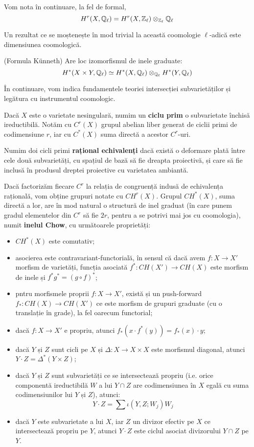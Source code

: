 \documentclass[13pt,openany]{book}
\begin{document}
Vom nota în continuare, la fel de formal,
$$H^r(X,\mathbb{Q}_\ell) = H^r(X,\mathbb{Z}_\ell) \otimes_{\mathbb{Z}_\ell} \mathbb{Q}_\ell$$

Un rezultat ce se moștenește în mod trivial la această coomologie $\ell$-adică este dimensiunea coomologică.

\begin{teo}
(Formula Künneth) Are loc izomorfismul de inele graduate:
$$H^*(X\times Y,\mathbb{Q}_\ell) \simeq H^*(X,\mathbb{Q}_\ell) \otimes_{\mathbb{Q}_\ell} H^*(Y,\mathbb{Q}_\ell)$$
\end{teo}

În continuare, vom indica fundamentele teoriei intersecției subvarietăților și legătura cu instrumentul coomologic.

Dacă $X$ este o varietate nesingulară, numim un {\bf ciclu prim} o subvarietate închisă ireductibilă. Notăm cu $C^r(X)$ grupul abelian liber generat de ciclii primi de codimensiune $r$, iar cu $C^*(X)$ suma directă a acestor $C^r$-uri.

Numim doi cicli primi {\bf rațional echivalenți} dacă există o deformare plată între cele două subvarietăți, cu spațiul de bază să fie dreapta proiectivă, și care să fie inclusă în produsul dreptei proiective cu varietatea ambiantă.

Dacă factorizăm fiecare $C^r$ la relația de congruență indusă de echivalența rațională, vom obține grupuri notate cu $CH^r(X)$. Grupul $CH^*(X)$, suma directă a lor, are în mod natural o structură de inel graduat (în care punem gradul elementelor din $C^r$ să fie $2r$, pentru a se potrivi mai jos cu coomologia), numit {\bf inelul Chow}, cu următoarele proprietăți:
\begin{itemize}
\item $CH^*(X)$ este comutativ;
\item asocierea este contravariant-functorială, în sensul că dacă avem $f: X \rightarrow X'$ morfism de varietăți, funcția asociată $f^*:CH(X') \rightarrow CH(X)$ este morfism de inele și $f^*g^* = (g \circ f)^*$;
\item pntru morfismele proprii $f: X \rightarrow X'$, există și un push-forward $f_*:CH(X) \rightarrow CH(X')$ ce este morfism de grupuri graduate (cu o translație în grade), la fel oarecum functorial;
\item dacă $f: X \rightarrow X'$ e propriu, atunci $f_*(x \cdot f^*(y)) = f_*(x) \cdot y$;
\item dacă $Y$ și $Z$ sunt cicli pe $X$ și $\Delta: X \rightarrow X \times X$ este morfismul diagonal, atunci $Y \cdot Z = \Delta^*(Y \times Z)$;
\item dacă $Y$ și $Z$ sunt subvarietăți ce se intersectează propriu (i.e. orice componentă ireductibilă $W$ a lui $Y \cap Z$ are codimensiunea în $X$ egală cu suma codimensiunilor lui $Y$ și $Z$), atunci:
$$Y \cdot Z = \sum \iota(Y,Z;W_j) W_j$$
\item dacă $Y$ este subvarietate a lui $X$, iar $Z$ un divizor efectiv pe $X$ ce intersectează propriu pe $Y$, atunci $Y \cdot Z$ este ciclul asociat divizorului $Y \cap Z$ pe $Y$.
\end{itemize}
\end{document}
